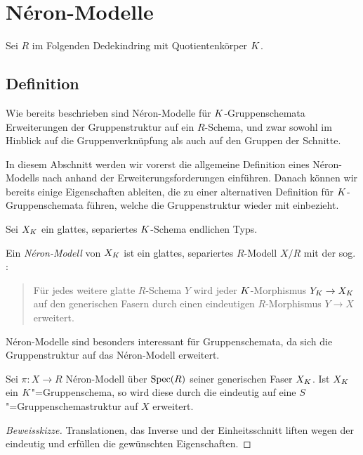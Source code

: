 \documentclass[german, bibliography=totoc]{scrreprt}
\renewcommand*{\optcite}[2][]{}
\begin{document}


\chapter{Néron-Modelle}\label{chap:neronmodelle}
Sei $R$ im Folgenden Dedekindring mit Quotientenkörper $K$.

\section{Definition}
Wie bereits beschrieben sind Néron-Modelle für $K$-Gruppenschemata
Erweiterungen der Gruppenstruktur auf ein $R$-Schema, und zwar sowohl
im Hinblick auf die Gruppenverknüpfung als auch auf den Gruppen der
Schnitte.

In diesem Abschnitt werden wir vorerst die allgemeine Definition eines
Néron-Modells nach \cite[1.2, Definition 1]{neron} anhand der
Erweiterungsforderungen einführen. Danach können wir bereits einige
Eigenschaften ableiten, die zu einer alternativen Definition für
$K$-Gruppenschemata führen, welche die Gruppenstruktur wieder mit
einbezieht.

\begin{Definition}
  \optcite[1.2, Definition 1]{neron}
  Sei $X_{K}$ ein glattes, separiertes $K$-Schema endlichen Typs.

  Ein \emph{Néron-Modell} von $X_{K}$ ist ein glattes, separiertes
  $R$-Modell $X/R$ %
  mit der sog. \emph{\NAbbEig}:
  \begin{quote}
    Für jedes weitere glatte $R$-Schema $Y$ wird jeder
    $K$-Morphismus $Y_{K}\to X_{K}$ auf den generischen Fasern durch
    einen eindeutigen $R$-Morphismus $Y\to X$ erweitert.
  \end{quote}
\end{Definition}

Néron-Modelle sind besonders interessant für Gruppenschemata, da sich
die Gruppenstruktur auf das Néron-Modell erweitert.
\begin{Bemerkung}\label{thm:gruppenschemaerweiterung}
  \optcite[1.2, Proposition 6]{neron}
  Sei $\pi\colon X\to R$ Néron-Modell über $\operatorname{Spec}(R)$ seiner
  generischen Faser $X_{K}$. Ist $X_{K}$ ein $K$"=Gruppenschema, so
  wird diese durch die \NAbbEig eindeutig auf eine
  $S$"=Gruppenschemastruktur auf $X$ erweitert.
  \begin{proof}[Beweisskizze]
    Translationen, das Inverse und der Einheitsschnitt liften wegen
    der \NAbbEig eindeutig und erfüllen die gewünschten Eigenschaften.
  \end{proof}
\end{Bemerkung}
\end{document}
